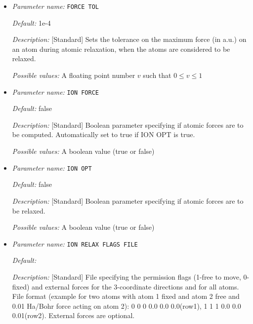 \begin{itemize}
{\it Possible values:} A boolean value (true or false)
\item {\it Parameter name:} {\tt FORCE TOL}
\label{parameters:Geometry/Optimization/FORCE TOL}
\label{parameters:Geometry/Optimization/FORCE_20TOL}




{\it Default:} 1e-4


{\it Description:} [Standard] Sets the tolerance on the maximum force (in a.u.) on an atom during atomic relaxation, when the atoms are considered to be relaxed.


{\it Possible values:} A floating point number $v$ such that $0 \leq v \leq 1$
\item {\it Parameter name:} {\tt ION FORCE}
\label{parameters:Geometry/Optimization/ION FORCE}
\label{parameters:Geometry/Optimization/ION_20FORCE}




{\it Default:} false


{\it Description:} [Standard] Boolean parameter specifying if atomic forces are to be computed. Automatically set to true if ION OPT is true.


{\it Possible values:} A boolean value (true or false)
\item {\it Parameter name:} {\tt ION OPT}
\label{parameters:Geometry/Optimization/ION OPT}
\label{parameters:Geometry/Optimization/ION_20OPT}




{\it Default:} false


{\it Description:} [Standard] Boolean parameter specifying if atomic forces are to be relaxed.


{\it Possible values:} A boolean value (true or false)
\item {\it Parameter name:} {\tt ION RELAX FLAGS FILE}
\label{parameters:Geometry/Optimization/ION RELAX FLAGS FILE}
\label{parameters:Geometry/Optimization/ION_20RELAX_20FLAGS_20FILE}




{\it Default:} 


{\it Description:} [Standard] File specifying the permission flags (1-free to move, 0-fixed) and external forces for the 3-coordinate directions and for all atoms. File format (example for two atoms with atom 1 fixed and atom 2 free and 0.01 Ha/Bohr force acting on atom 2): 0 0 0 0.0 0.0 0.0(row1), 1 1 1 0.0 0.0 0.01(row2). External forces are optional.



\end{itemize}
